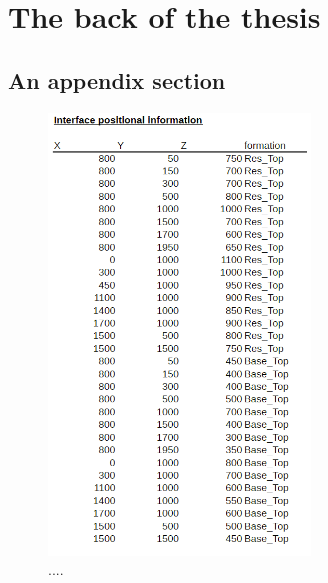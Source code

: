\documentclass[a4paper,11pt]{MScThesis}
\begin{document}
\cleardoublepage
		
		
		
		




%
    


\appendix

    \chapter{The back of the thesis}

    \section{An appendix section}
    
    \begin{figure}[h]
    	\centering
    	\includegraphics[width=0.62\textwidth]{Figures/Appendix/CSV_input1}
    	\caption{....}\label{fig:CSV_input1}
    \end{figure}
\end{document}
